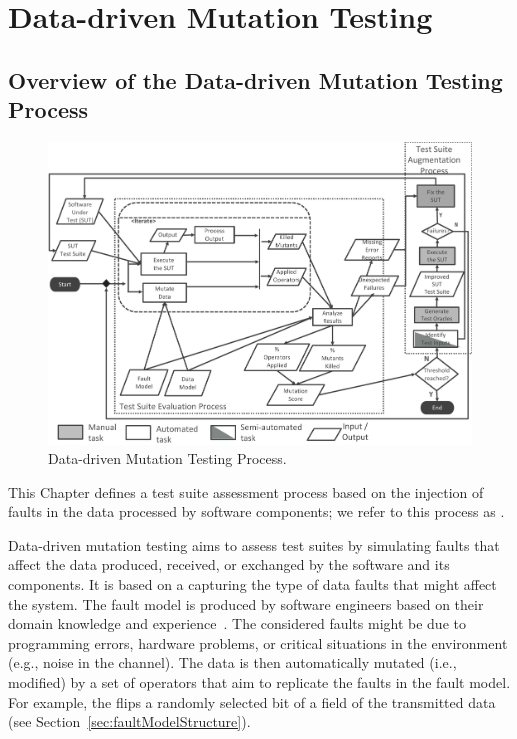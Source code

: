 
\chapter{Data-driven Mutation Testing}
\label{chapter:datamutation}


\section{Overview of the Data-driven Mutation Testing Process}
\label{sec:dataProcess}

	\begin{figure}
	\centering
		\includegraphics[width=\textwidth]{images/dataProcess}
		\caption{Data-driven Mutation Testing Process.}
		\label{fig:data:process}
	\end{figure}



This Chapter defines a test suite assessment process based on the injection of faults in the data processed by software components; we refer to this process as . 

Data-driven mutation testing aims to assess test suites by simulating faults that affect the data produced, received, or exchanged by the software and its components.
It is based on a  capturing the type of data faults that might affect the system. The fault model is produced by software engineers based on their domain knowledge and experience~\cite{di2015generating}. The considered faults might be due to programming errors, hardware problems, or critical situations in the environment (e.g., noise in the channel). The data is then automatically  mutated (i.e., modified) by a set of operators that aim to replicate the faults in the fault model. For example, the  flips a randomly selected bit of a field of the transmitted data (see Section~\ref{sec:faultModelStructure}). 


